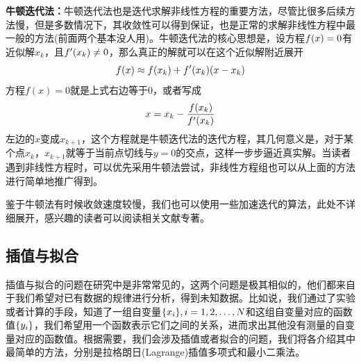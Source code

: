 \documentclass[12pt,a4paper,openany,twoside]{book}
\numberwithin{equation}{section}
\begin{document}
          \textbf{牛顿迭代法：}牛顿迭代法也是迭代求解非线性方程的重要方法，尽管比很多后续方法慢，但是多数情况下，其收敛性可以得到保证，也是正常的求解非线性方程中最一般的方法(前面两个基本没人用)。牛顿迭代法的核心思想是，设方程$f\qty(x)=0$有近似解$x_k$，且$f'\qty(x_k)\neq0$，那么真正的解就可以在这个近似解附近展开
          \begin{equation*}
            f(x) \approx f\qty(x_k)+f'\qty(x_k)\qty(x-x_k)
          \end{equation*}
          方程$f(x)=0$就是上式右边等于0，或者写成
          \begin{equation*}
            x=x_k-\frac{f\qty(x_k)}{f'\qty(x_k)}
          \end{equation*}
          左边的$x$变成$x_{k+1}$，这个方程就是牛顿迭代法的迭代方程，其几何意义是，对于某个点$x_k$，$x_{k+1}$就等于当前点切线与$y=0$的交点，这样一步步逼近真实解。当读者遇到非线性方程时，可以优先采用牛顿法尝试，非线性方程组也可以从上面的方法进行简单地推广得到。

          鉴于牛顿法有时候收敛速度较慢，我们也可以使用一些加速迭代的算法，此处不详细展开，感兴趣的读者可以阅读相关文献专著。
        \subsection{插值与拟合}
          插值与拟合的问题在研究中是非常常见的，这两个问题是极其相似的，他们都来自于我们希望对已有数据的规律进行分析，得到未知数据。比如说，我们通过了实验或者计算的手段，知道了一组自变量$\qty{x_i},i=1,2,\dots,N$和这组自变量对应的函数值$\qty{y_i}$，我们希望用一个函数表示它们之间的关系，进而求出其他没有测量的自变量对应的函数值。根据需要，我们会涉及插值或者拟合的问题，我们将各介绍其中最简单的方法，分别是拉格朗日(Lagrange)插值多项式和最小二乘法。
\end{document}
